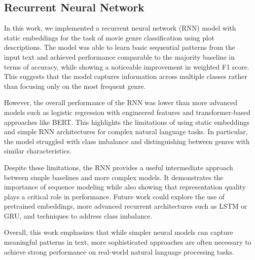 \subsection{Recurrent Neural Network}

In this work, we implemented a recurrent neural network (RNN) model with static embeddings for the task of movie genre classification using plot descriptions. The model was able to learn basic sequential patterns from the input text and achieved performance comparable to the majority baseline in terms of accuracy, while showing a noticeable improvement in weighted F1 score. This suggests that the model captures information across multiple classes rather than focusing only on the most frequent genre.

However, the overall performance of the RNN was lower than more advanced models such as logistic regression with engineered features and transformer-based approaches like BERT. This highlights the limitations of using static embeddings and simple RNN architectures for complex natural language tasks. In particular, the model struggled with class imbalance and distinguishing between genres with similar characteristics.

Despite these limitations, the RNN provides a useful intermediate approach between simple baselines and more complex models. It demonstrates the importance of sequence modeling while also showing that representation quality plays a critical role in performance. Future work could explore the use of pretrained embeddings, more advanced recurrent architectures such as LSTM or GRU, and techniques to address class imbalance.

Overall, this work emphasizes that while simpler neural models can capture meaningful patterns in text, more sophisticated approaches are often necessary to achieve strong performance on real-world natural language processing tasks.